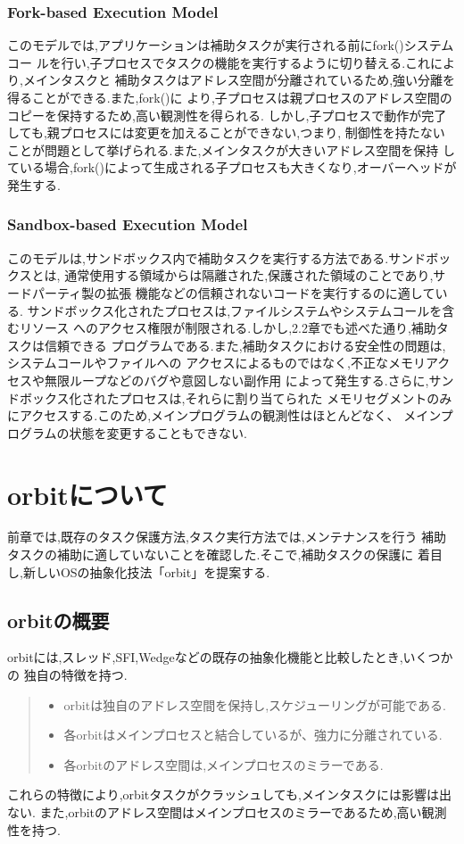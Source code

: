\documentclass[submit,techreq,noauthor]{eco}	%
\begin{document}
\subsubsection*{Fork-based Execution Model}
このモデルでは,アプリケーションは補助タスクが実行される前にfork()システムコー
ルを行い,子プロセスでタスクの機能を実行するように切り替える.これにより,メインタスクと
補助タスクはアドレス空間が分離されているため,強い分離を得ることができる.また,fork()に
より,子プロセスは親プロセスのアドレス空間のコピーを保持するため,高い観測性を得られる.
しかし,子プロセスで動作が完了しても,親プロセスには変更を加えることができない,つまり,
制御性を持たないことが問題として挙げられる.また,メインタスクが大きいアドレス空間を保持
している場合,fork()によって生成される子プロセスも大きくなり,オーバーヘッドが発生する.

\subsubsection*{Sandbox-based Execution Model}
このモデルは,サンドボックス内で補助タスクを実行する方法である.サンドボックスとは,
通常使用する領域からは隔離された,保護された領域のことであり,サードパーティ製の拡張
機能などの信頼されないコードを実行するのに適している.
サンドボックス化されたプロセスは,ファイルシステムやシステムコールを含むリソース
へのアクセス権限が制限される.しかし,2.2章でも述べた通り,補助タスクは信頼できる
プログラムである.また,補助タスクにおける安全性の問題は,システムコールやファイルへの
アクセスによるものではなく,不正なメモリアクセスや無限ループなどのバグや意図しない副作用
によって発生する.さらに,サンドボックス化されたプロセスは,それらに割り当てられた
メモリセグメントのみにアクセスする.このため,メインプログラムの観測性はほとんどなく、
メインプログラムの状態を変更することもできない.

\section{orbitについて}

前章では,既存のタスク保護方法,タスク実行方法では,メンテナンスを行う
補助タスクの補助に適していないことを確認した.そこで,補助タスクの保護に
着目し,新しいOSの抽象化技法「orbit」を提案する.

\subsection{orbitの概要}
orbitには,スレッド,SFI,Wedgeなどの既存の抽象化機能と比較したとき,いくつかの
独自の特徴を持つ.
\begin{quote}
  \begin{itemize}
   \item orbitは独自のアドレス空間を保持し,スケジューリングが可能である.
   \item 各orbitはメインプロセスと結合しているが、強力に分離されている.
   \item 各orbitのアドレス空間は,メインプロセスのミラーである.
  \end{itemize}
\end{quote}
これらの特徴により,orbitタスクがクラッシュしても,メインタスクには影響は出ない.
また,orbitのアドレス空間はメインプロセスのミラーであるため,高い観測性を持つ.
\end{document}
